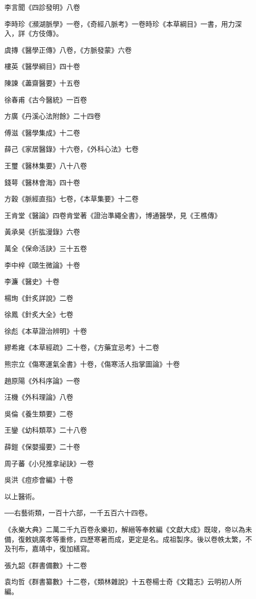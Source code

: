 李言聞《四診發明》八卷

李時珍《瀕湖脈學》一卷，《奇經八脈考》一卷時珍《本草綱目》一書，用力深入，詳《方伎傳》。

虞摶《醫學正傳》八卷，《方脈發蒙》六卷

樓英《醫學綱目》四十卷

陳諫《藎齋醫要》十五卷

徐春甫《古今醫統》一百卷

方廣《丹溪心法附餘》二十四卷

傅滋《醫學集成》十二卷

薛己《家居醫錄》十六卷，《外科心法》七卷

王璽《醫林集要》八十八卷

錢萼《醫林會海》四十卷

方穀《脈經直指》七卷，《本草集要》十二卷

王肯堂《醫論》四卷肯堂著《證治準繩全書》，博通醫學，見《王樵傳》

黃承昊《折肱漫錄》六卷

萬全《保命活訣》三十五卷

李中梓《頤生微論》十卷

李濂《醫史》十卷

楊珣《針炙詳說》二卷

徐鳳《針炙大全》七卷

徐彪《本草證治辨明》十卷

繆希雍《本草經疏》二十卷，《方藥宜忌考》十二卷

熊宗立《傷寒運氣全書》十卷，《傷寒活人指掌圖論》十卷

趙原陽《外科序論》一卷

汪機《外科理論》八卷

吳倫《養生類要》二卷

王鑾《幼科類萃》二十八卷

薛鎧《保嬰撮要》二十卷

周子蕃《小兒推拿祕訣》一卷

吳洪《痘疹會編》十卷

以上醫術。

──右藝術類，一百十六部，一千五百六十四卷。

《永樂大典》二萬二千九百卷永樂初，解縉等奉敕編《文獻大成》既竣，帝以為未備，復敕姚廣孝等重修，四歷寒暑而成，更定是名。成祖製序。後以卷帙太繁，不及刊布，嘉靖中，復加繕寫。

張九韶《群書備數》十二卷

袁均哲《群書纂數》十二卷，《類林雜說》十五卷楊士奇《文籍志》云明初人所編。

